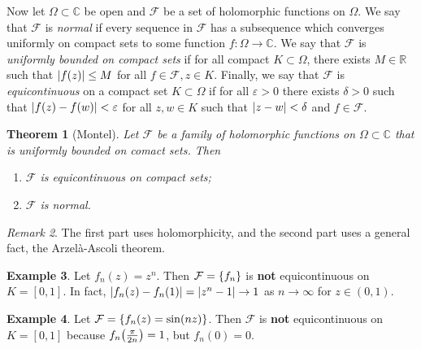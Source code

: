 \documentclass[leqno, openany]{memoir}
\newtheorem{thm}{Theorem}[section]
\theoremstyle{definition}
\newtheorem{exm}[thm]{Example}
\theoremstyle{remark}
\newtheorem{rmk}[thm]{Remark}
\theoremstyle{plain}
\theoremstyle{definition}
\theoremstyle{remark}
\newcommand{\R}{\mathbb{R}}
\newcommand{\C}{\mathbb{C}}
\newcommand{\ep}{\varepsilon}
\newcommand{\mc}[1]{\mathcal{#1}}
\begin{document}
Now let $\Omega \subset \C$ be open and $\mc{F}$ be a set of holomorphic
functions on $\Omega$. We say that $\mc{F}$ is \textit{normal} if every
sequence in $\mc{F}$ has a subsequence which converges uniformly on compact
sets to some function $f \colon \Omega \to \C$. We say that $\mc{F}$ is
\textit{uniformly bounded on compact sets} if for all compact $K \subset
\Omega$, there exists $M \in \R$ such that $\abs{f(z)} \leq M$ for all $f \in
\mc{F}, z \in K$. Finally, we say that $\mc{F}$ is \textit{equicontinuous} on a
compact set $K \subset \Omega$ if for all $\ep > 0$ there exists $\delta > 0$
such that $\abs{f(z) - f(w)} < \ep$ for all $z,w \in K$ such that $\abs{z - w}
< \delta$ and $f \in \mc{F}$.

\begin{thm}[Montel] Let $\mc{F}$ be a family of holomorphic functions on
$\Omega \subset \C$ that is uniformly bounded on comact sets. Then
\begin{enumerate} \item $\mc{F}$ is equicontinuous on compact sets; \item
$\mc{F}$ is normal.  \end{enumerate} \end{thm}

\begin{rmk} The first part uses holomorphicity, and the second part uses a
general fact, the Arzel\`a-Ascoli theorem.  \end{rmk}

\begin{exm} Let $f_n(z) = z^n$. Then $\mc{F} = \qty{f_n}$ is \textbf{not}
equicontinuous on $K = [0,1]$. In fact, $\abs{f_n(z) - f_n(1)} = \abs{z^n - 1}
\to 1$ as $n \to \infty$ for $z \in (0,1)$.  \end{exm}

\begin{exm} Let $\mc{F} = \qty{f_n(z) = \sin(nz)}$. Then $\mc{F}$ is
\textbf{not} equicontinuous on $K = [0,1]$ because $f_n\qty(\frac{\pi}{2n}) =
1$, but $f_n(0) = 0$.  \end{exm}
\end{document}
